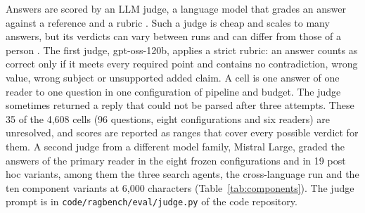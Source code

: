 Answers are scored by an LLM judge, a language model that grades an answer against a reference and a rubric \citep{zheng2023judge}. Such a judge is cheap and scales to many answers, but its verdicts can vary between runs and can differ from those of a person \citep{faggioli2023perspectives,thakur2025judging,haldar2025roulette}. The first judge, gpt-oss-120b, applies a strict rubric: an answer counts as correct only if it meets every required point and contains no contradiction, wrong value, wrong subject or unsupported added claim. A cell is one answer of one reader to one question in one configuration of pipeline and budget. The judge sometimes returned a reply that could not be parsed after three attempts. These 35 of the 4,608 cells (96 questions, eight configurations and six readers) are unresolved, and scores are reported as ranges that cover every possible verdict for them. A second judge from a different model family, Mistral Large, graded the answers of the primary reader in the eight frozen configurations and in 19 post hoc variants, among them the three search agents, the cross-language run and the ten component variants at 6,000 characters (Table~\ref{tab:components}). %
The judge prompt is in \texttt{code/ragbench/eval/judge.py} of the code repository.

